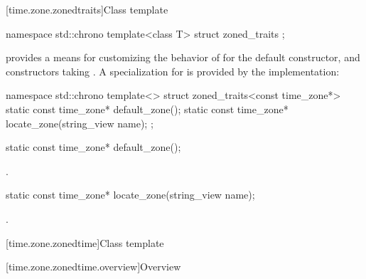 [time.zone.zonedtraits]{Class template }

\begin{codeblock}
namespace std::chrono {
  template<class T> struct zoned_traits {};
}
\end{codeblock}

\pnum
{} provides a means for customizing
the behavior of 
for the  default constructor,
and constructors taking .
A specialization for  is provided by the implementation:

\begin{codeblock}
namespace std::chrono {
  template<> struct zoned_traits<const time_zone*> {
    static const time_zone* default_zone();
    static const time_zone* locate_zone(string_view name);
  };
}
\end{codeblock}

%
\begin{itemdecl}
static const time_zone* default_zone();
\end{itemdecl}

\begin{itemdescr}
\pnum
\returns
{}.
\end{itemdescr}

%
\begin{itemdecl}
static const time_zone* locate_zone(string_view name);
\end{itemdecl}

\begin{itemdescr}
\pnum
\returns
{}.
\end{itemdescr}

[time.zone.zonedtime]{Class template }

[time.zone.zonedtime.overview]{Overview}

